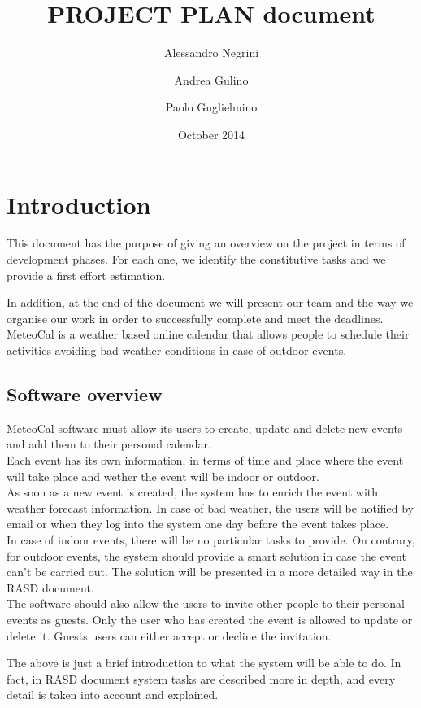 \documentclass[12pt]{book}
\title{PROJECT PLAN document}
\author{Alessandro Negrini \and Andrea Gulino \and Paolo Guglielmino}
\date{October 2014}
\begin{document}

\tableofcontents
\newpage\null\thispagestyle{empty}\newpage

\chapter{Introduction}
This document has the purpose of giving an overview on the project in terms of development phases. For each one, we identify the constitutive tasks and we provide a first effort estimation. \\ \medskip

In addition, at the end of the document we will present our team and the way we organise our work in order to successfully complete and meet the deadlines.\\ 
MeteoCal is a weather based online calendar that allows people to schedule their activities avoiding bad weather conditions in case of outdoor events.
\section{Software overview}
MeteoCal software must allow its users to create, update and delete new events and add them to their personal calendar.\\ Each event has its own information, in terms of time and place where the event will take place and wether the event will be indoor or outdoor. \\
As soon as a new event is created, the system has to enrich the event with weather forecast information. In case of bad weather, the users will be notified by email or when they log into the system one day before the event takes place. \\
In case of indoor events, there will be no particular tasks to provide. On contrary, for outdoor events, the system should provide a smart solution in case the event can't be carried out. The solution will be presented in a more detailed way in the RASD document. \\
The software should also allow the users to invite other people to their personal events as guests. Only the user who has created the event is allowed to update or delete it. Guests users can either accept or decline the invitation. \\ \medskip

The above is just a brief introduction to what the system will be able to do. In fact, in RASD document system tasks are described more in depth, and every detail is taken into account and explained. \\
\end{document}
